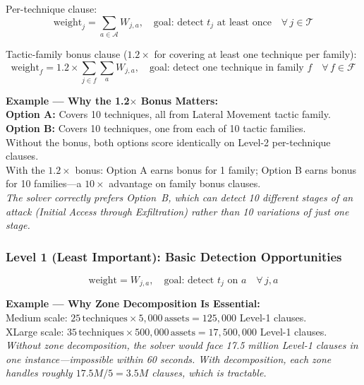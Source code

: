 \documentclass[journal]{IEEEtran}
\newcommand{\calT}{\mathcal{T}}
\newcommand{\calA}{\mathcal{A}}
\begin{document}
Per-technique clause:
\begin{equation}
  \text{weight}_j = \sum_{a \in \calA} W_{j,a},
  \quad \text{goal: detect } t_j
  \text{ at least once} \quad \forall\, j \in \calT
\end{equation}

Tactic-family bonus clause ($1.2\times$ for covering at least
one technique per family):
\begin{equation}
  \text{weight}_f = 1.2 \times \sum_{j \in f} \sum_a W_{j,a},
  \quad \text{goal: detect one technique in family } f
  \quad \forall\, f \in \mathcal{F}
\end{equation}

\begin{examplebox}
\textbf{Example --- Why the 1.2$\times$ Bonus Matters:}\\[3pt]
\textbf{Option A:} Covers 10 techniques, all from Lateral
Movement tactic family.\\
\textbf{Option B:} Covers 10 techniques, one from each of
10 tactic families.\\[3pt]
Without the bonus, both options score identically on
Level-2 per-technique clauses.\\
With the $1.2\times$ bonus: Option A earns bonus for
1 family; Option B earns bonus for 10 families---a
$10\times$ advantage on family bonus clauses.\\[3pt]
\textit{The solver correctly prefers Option~B, which can
detect 10 \emph{different stages} of an attack
(Initial Access through Exfiltration) rather than
10 variations of just one stage.}
\end{examplebox}

\subsubsection{Level 1 (Least Important): Basic Detection
              Opportunities}
\begin{equation}
  \text{weight} = W_{j,a},
  \quad \text{goal: detect } t_j \text{ on } a
  \quad \forall\, j, a
\end{equation}

\begin{examplebox}
\textbf{Example --- Why Zone Decomposition Is Essential:}\\[3pt]
Medium scale: $25\,\text{techniques} \times
5{,}000\,\text{assets} = 125{,}000$ Level-1 clauses.\\
XLarge scale: $35\,\text{techniques} \times
500{,}000\,\text{assets} = 17{,}500{,}000$ Level-1 clauses.\\[3pt]
\textit{Without zone decomposition, the solver would face
17.5 million Level-1 clauses in one instance---impossible
within 60 seconds.
With decomposition, each zone handles roughly
$17.5M/5 = 3.5M$ clauses, which is tractable.}
\end{examplebox}
\end{document}
